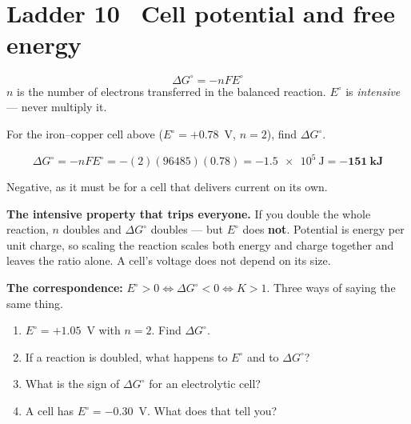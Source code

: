 \documentclass{apchem-worksheet}
\begin{document}
\section*{\sffamily Ladder 10 \textbullet\ Cell potential and free energy}

\[ \Delta G^\circ = -nFE^\circ \]
$n$ is the number of electrons transferred in the balanced reaction.
$E^\circ$ is \emph{intensive} --- never multiply it.

\begin{workedexample}
For the iron--copper cell above ($E^\circ = +0.78$~V, $n = 2$), find
$\Delta G^\circ$.

\[ \Delta G^\circ = -nFE^\circ = -(2)(96485)(0.78)
   = \num{-1.5e5}~\text{J} = \mathbf{-151~kJ} \]

Negative, as it must be for a cell that delivers current on its own.

\textbf{The intensive property that trips everyone.} If you double the
whole reaction, $n$ doubles and $\Delta G^\circ$ doubles --- but
$E^\circ$ does \textbf{not}. Potential is energy per unit charge, so
scaling the reaction scales both energy and charge together and leaves the
ratio alone. A cell's voltage does not depend on its size.

\textbf{The correspondence:} $E^\circ > 0 \Leftrightarrow
\Delta G^\circ < 0 \Leftrightarrow K > 1$. Three ways of saying the same
thing.
\end{workedexample}

\begin{yourturn}
\begin{enumerate}[leftmargin=*,itemsep=0.5em]
  \item $E^\circ = +1.05$~V with $n = 2$. Find $\Delta G^\circ$.
        \workspace[1.8cm]
  \item If a reaction is doubled, what happens to $E^\circ$ and to
        $\Delta G^\circ$? \workspace[1.8cm]
  \item What is the sign of $\Delta G^\circ$ for an electrolytic cell?
        \workspace[1.4cm]
  \item A cell has $E^\circ = -0.30$~V. What does that tell you?
        \workspace[1.8cm]
\end{enumerate}
\end{yourturn}
\end{document}
